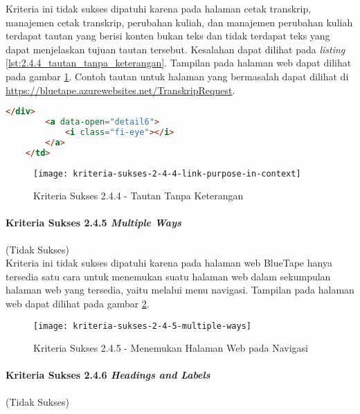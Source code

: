 Kriteria ini tidak sukses dipatuhi karena pada halaman cetak transkrip, manajemen cetak transkrip, perubahan kuliah, dan manajemen perubahan kuliah terdapat tautan yang berisi konten bukan teks dan tidak terdapat teks yang dapat menjelaskan tujuan tautan tersebut. Kesalahan dapat dilihat pada \textit{listing} \ref{lst:2.4.4_tautan_tanpa_keterangan}. Tampilan pada halaman web dapat dilihat pada gambar \ref{fig:2.4.4_link_purpose_in_context}. Contoh tautan untuk halaman yang bermasalah dapat dilihat di \url{https://bluetape.azurewebsites.net/TranskripRequest}.

\begin{lstlisting}[frame=single, label={lst:2.4.4_tautan_tanpa_keterangan}, language=HTML, caption=Kriteria Sukses 2.4.4 - Tautan Tanpa Keterangan]
        </div>
        <a data-open="detail6">
            <i class="fi-eye"></i>
        </a>
    </td>
\end{lstlisting}

\begin{figure}[H]
    \centering  
    \texttt{[image: kriteria-sukses-2-4-4-link-purpose-in-context]}  
    \caption[Kriteria Sukses 2.4.4 - Tautan Tanpa Keterangan]{Kriteria Sukses 2.4.4 - Tautan Tanpa Keterangan}
    \label{fig:2.4.4_link_purpose_in_context}  
\end{figure} 

\paragraph{Kriteria Sukses 2.4.5 \textit{Multiple Ways}}
\label{par:kepatuhan_bluetape_kriteria_sukses_2.4.5}
(Tidak Sukses)\\

Kriteria ini tidak sukses dipatuhi karena pada halaman web BlueTape hanya tersedia satu cara untuk menemukan suatu halaman web dalam sekumpulan halaman web yang tersedia, yaitu melalui menu navigasi. Tampilan pada halaman web dapat dilihat pada gambar \ref{fig:2.4.5_multiple_ways}.

\begin{figure}[H]
    \centering  
    \texttt{[image: kriteria-sukses-2-4-5-multiple-ways]}  
    \caption[Kriteria Sukses 2.4.5 - Menemukan Halaman Web pada Navigasi]{Kriteria Sukses 2.4.5 - Menemukan Halaman Web pada Navigasi}
    \label{fig:2.4.5_multiple_ways}  
\end{figure}

\paragraph{Kriteria Sukses 2.4.6 \textit{Headings and Labels}}
\label{par:kepatuhan_bluetape_kriteria_sukses_2.4.6}
(Tidak Sukses)\\

